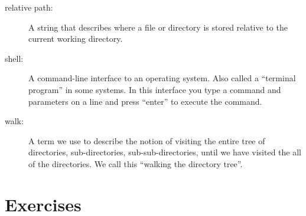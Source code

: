 \begin{description}
\item[relative path:] A string that describes where a file or
directory is stored relative to the current working 
directory.

\item[shell:] A command-line interface to an operating system.
Also called a ``terminal program'' in some systems. In this interface
you type a command and parameters on a line and press ``enter''
to execute the command.

\item[walk:] A term we use to describe the notion of visiting
the entire tree of directories, sub-directories, sub-sub-directories, 
until we have visited the all of the directories.  We call this
``walking the directory tree''.

\end{description}


\section{Exercises}


